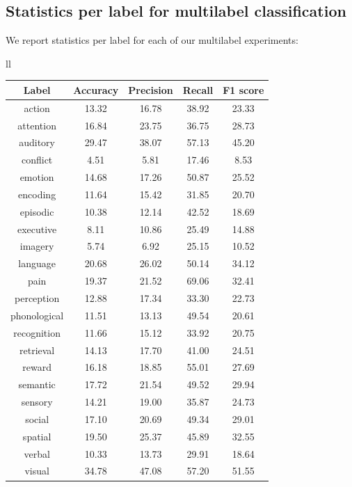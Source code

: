 \documentclass{article} %
\begin{document}
\subsection{Statistics per label for multilabel classification}
We report statistics per label for each of our multilabel experiments:
\begin{table}[h]
\begin{center}
\begin{tabular}{ll}
\begin{tabular}{|c|c|c|c|c|}
\hline
 \bf{Label}  & \bf{Accuracy} & \bf{Precision} & \bf{Recall}    & \bf{F1 score} \\ \hline
action	& 13.32	& 16.78	& 38.92	& 23.33	\\ \hline 
attention	& 16.84	& 23.75	& 36.75	& 28.73	\\ \hline 
auditory	& 29.47	& 38.07	& 57.13	& 45.20	\\ \hline 
conflict	& 4.51	& 5.81	& 17.46	& 8.53	\\ \hline 
emotion	& 14.68	& 17.26	& 50.87	& 25.52	\\ \hline 
encoding	& 11.64	& 15.42	& 31.85	& 20.70	\\ \hline 
episodic	& 10.38	& 12.14	& 42.52	& 18.69	\\ \hline 
executive	& 8.11	& 10.86	& 25.49	& 14.88	\\ \hline 
imagery	& 5.74	& 6.92	& 25.15	& 10.52	\\ \hline 
language	& 20.68	& 26.02	& 50.14	& 34.12	\\ \hline 
pain	& 19.37	& 21.52	& 69.06	& 32.41	\\ \hline 
perception	& 12.88	& 17.34	& 33.30	& 22.73	\\ \hline 
phonological	& 11.51	& 13.13	& 49.54	& 20.61	\\ \hline 
recognition	& 11.66	& 15.12	& 33.92	& 20.75	\\ \hline 
retrieval	& 14.13	& 17.70	& 41.00	& 24.51	\\ \hline 
reward	& 16.18	& 18.85	& 55.01	& 27.69	\\ \hline 
semantic	& 17.72	& 21.54	& 49.52	& 29.94	\\ \hline 
sensory	& 14.21	& 19.00	& 35.87	& 24.73	\\ \hline 
social	& 17.10	& 20.69	& 49.34	& 29.01	\\ \hline 
spatial	& 19.50	& 25.37	& 45.89	& 32.55	\\ \hline 
verbal	& 10.33	& 13.73	& 29.91	& 18.64	\\ \hline 
visual	& 34.78	& 47.08	& 57.20	& 51.55	\\ \hline 

\end{tabular}
\end{tabular}
\end{center}
\end{table}
\end{document}
